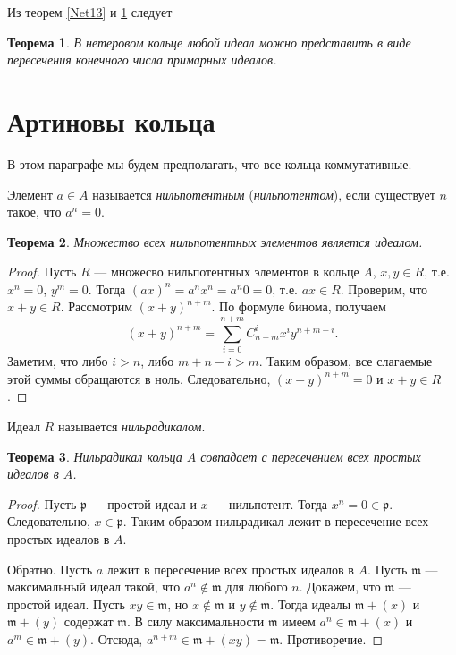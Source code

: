 \documentclass[12pt, titlepage, oneside]{amsbook}
\newcommand{\ppp}{\mathfrak{p}}
\newcommand{\mmm}{\mathfrak{m}}
\newtheorem{theorem}{Теорема}[chapter]
\theoremstyle{definition}
\theoremstyle{remark}
\begin{document}
Из теорем \ref{Net13} и \ref{Net14} следует

\begin{theorem}
	\label{Net14}
	В нетеровом кольце любой идеал можно представить в виде пересечения конечного числа примарных идеалов.
\end{theorem}

\section{Артиновы кольца}

В этом параграфе мы будем предполагать, что все кольца коммутативные.

Элемент $a\in A$ называется \emph{нильпотентным} (\emph{нильпотентом}), если существует $n$ такое, что $a^n=0$.

\begin{theorem}
	\label{Rad1}
	Множество всех нильпотентных элементов является идеалом.
\end{theorem}

\begin{proof}
	Пусть $R$ --- множесво нильпотентных элементов в кольце $A$, $x,y\in R$, т.е. $x^n=0$, $y^m=0$. Тогда $(ax)^n=a^nx^n=a^n0=0$, т.е. $ax\in R$. Проверим, что $x+y\in R$. Рассмотрим $(x+y)^{n+m}$. По формуле бинома, получаем $$(x+y)^{n+m}=\sum\limits_{i=0}^{n+m}C_{n+m}^ix^iy^{n+m-i}.$$ Заметим, что либо $i>n$, либо $m+n-i>m$. Таким образом, все слагаемые этой суммы обращаются в ноль. Следовательно, $(x+y)^{n+m}=0$ и $x+y\in R$.
\end{proof}

Идеал $R$ называется \emph{нильрадикалом}.

\begin{theorem}
	\label{Rad2}
	Нильрадикал кольца $A$ совпадает с пересечением всех простых идеалов в $A$.
\end{theorem}

\begin{proof}
	Пусть $\ppp$ --- простой идеал и $x$ --- нильпотент. Тогда $x^n=0\in\ppp$. Следовательно, $x\in\ppp$. Таким образом нильрадикал лежит в пересечение всех простых идеалов в $A$.
	
	Обратно. Пусть $a$ лежит в пересечение всех простых идеалов в $A$. Пусть $\mmm$ --- максимальный идеал такой, что $a^n\not\in\mmm$ для любого $n$. Докажем, что $\mmm$  --- простой идеал. Пусть $xy\in\mmm$, но $x\not\in\mmm$ и $y\not\in\mmm$. Тогда идеалы $\mmm+(x)$ и $\mmm+(y)$ содержат $\mmm$. В силу максимальности $\mmm$ имеем $a^n\in \mmm+(x)$ и $a^m\in\mmm+(y)$. Отсюда, $a^{n+m}\in \mmm+(xy)=\mmm$. Противоречие.
\end{proof}
\end{document}
